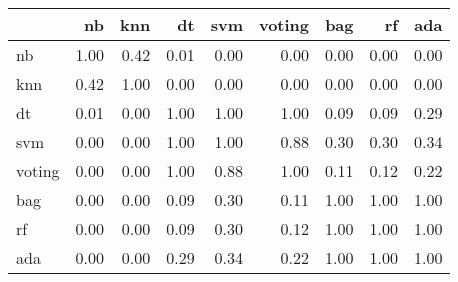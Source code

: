 \begin{tabular}{lrrrrrrrr}
\toprule
{} &   nb &  knn &   dt &  svm &  voting &  bag &   rf &  ada \\
\midrule
nb     & 1.00 & 0.42 & 0.01 & 0.00 &    0.00 & 0.00 & 0.00 & 0.00 \\
knn    & 0.42 & 1.00 & 0.00 & 0.00 &    0.00 & 0.00 & 0.00 & 0.00 \\
dt     & 0.01 & 0.00 & 1.00 & 1.00 &    1.00 & 0.09 & 0.09 & 0.29 \\
svm    & 0.00 & 0.00 & 1.00 & 1.00 &    0.88 & 0.30 & 0.30 & 0.34 \\
voting & 0.00 & 0.00 & 1.00 & 0.88 &    1.00 & 0.11 & 0.12 & 0.22 \\
bag    & 0.00 & 0.00 & 0.09 & 0.30 &    0.11 & 1.00 & 1.00 & 1.00 \\
rf     & 0.00 & 0.00 & 0.09 & 0.30 &    0.12 & 1.00 & 1.00 & 1.00 \\
ada    & 0.00 & 0.00 & 0.29 & 0.34 &    0.22 & 1.00 & 1.00 & 1.00 \\
\bottomrule
\end{tabular}
